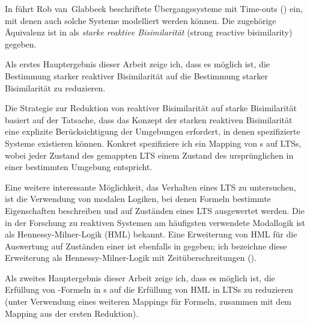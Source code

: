 In \cite{vanglabbeek2021failure} führt Rob van~Glabbeek beschriftete Übergangssysteme mit Time-outs (\LTSt{}) ein, mit denen auch solche Systeme modelliert werden können.
Die zugehörige Äquivalenz ist in \cite{rbs} als \emph{starke reaktive Bisimilarität} (strong reactive bisimilarity) gegeben.

Als erstes Hauptergebnis dieser Arbeit zeige ich, dass es möglich ist, die Bestimmung starker reaktiver Bisimilarität auf die Bestimmung starker \linebreak Bisimilarität zu reduzieren.

Die Strategie zur Reduktion von reaktiver Bisimilarität auf starke Bisimilarität basiert auf der Tatsache, dass das Konzept der starken reaktiven Bisimilarität eine explizite Berücksichtigung der Umgebungen erfordert, in denen spezifizierte Systeme existieren können. Konkret spezifiziere ich ein Mapping von \LTSt{}s auf LTSs, wobei jeder Zustand des gemappten LTS einem Zustand des ursprünglichen \LTSt{} in einer bestimmten Umgebung entspricht.

Eine weitere interessante Möglichkeit, das Verhalten eines LTS zu untersuchen, ist die Verwendung von modalen Logiken, bei denen Formeln bestimmte Eigenschaften beschreiben und auf Zuständen eines LTS ausgewertet werden. Die in der Forschung zu reaktiven Systemen am häufigsten verwendete Modallogik ist als Hennessy-Milner-Logik (HML) bekannt. 
Eine Erweiterung von HML für die Auswertung auf Zuständen einer \LTSt{} ist ebenfalls in \cite{rbs} gegeben; ich bezeichne diese Erweiterung als Hennessy-Milner-Logik mit Zeitüberschreitungen (\HMLt{}).

Als zweites Hauptergebnis dieser Arbeit zeige ich, dass es möglich ist, die Erfüllung von \HMLt{}-Formeln in \LTSt{}s auf die Erfüllung von HML in LTSs zu reduzieren (unter Verwendung eines weiteren Mappings für Formeln, zusammen mit dem Mapping aus der ersten Reduktion).

\thispagestyle{empty}
